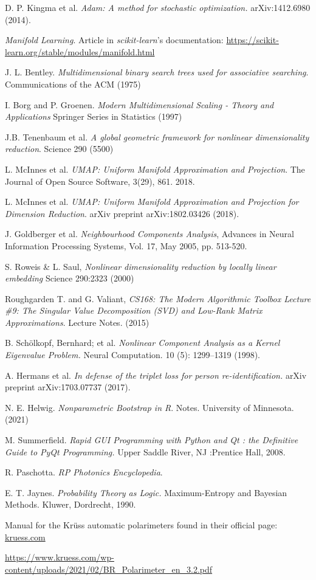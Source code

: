 \documentclass[11pt, a4paper, twoside]{article} %
\begin{document}
\begin{thebibliography}{1}
{
D. P. Kingma et al. {\em Adam: A method for stochastic optimization.} arXiv:1412.6980 (2014).

{\em Manifold Learning}. Article in {\em scikit-learn}'s documentation: \href{https://scikit-learn.org/stable/modules/manifold.html}{https://scikit-learn.org/stable/modules/manifold.html}

J. L. Bentley. {\em Multidimensional binary search trees used for associative searching}. Communications of the ACM (1975)

I. Borg and P. Groenen. {\em Modern Multidimensional Scaling - Theory and Applications} Springer Series in Statistics (1997)

J.B. Tenenbaum et al. {\em A global geometric framework for nonlinear dimensionality reduction}.  Science 290 (5500)


L. McInnes et al. {\em UMAP: Uniform Manifold Approximation and Projection}. The Journal of Open Source Software, 3(29), 861. 2018.

L. McInnes et al. {\em UMAP: Uniform Manifold Approximation and Projection for Dimension Reduction}. arXiv preprint arXiv:1802.03426 (2018).

J. Goldberger et al. {\em Neighbourhood Components Analysis}, Advances in Neural Information Processing Systems, Vol. 17, May 2005, pp. 513-520.

S. Roweis \& L. Saul, {\em Nonlinear dimensionality reduction by locally linear embedding} Science 290:2323 (2000)

Roughgarden T. and G. Valiant, {\em CS168: The Modern Algorithmic Toolbox Lecture \#9: The Singular Value Decomposition (SVD) and Low-Rank Matrix Approximations}. Lecture Notes. (2015)

B. Schölkopf, Bernhard; et al. {\em Nonlinear Component Analysis as a Kernel Eigenvalue Problem.} Neural Computation. 10 (5): 1299–1319 (1998).

A. Hermans et al. {\em In defense of the triplet loss for person re-identification.} arXiv preprint arXiv:1703.07737 (2017).

N. E. Helwig. {\em Nonparametric Bootstrap in R}. Notes. University of Minnesota. (2021)

M. Summerfield. {\em Rapid GUI Programming with Python and Qt : the Definitive Guide to PyQt Programming.} Upper Saddle River, NJ :Prentice Hall, 2008.

R. Paschotta. {\em RP Photonics Encyclopedia}.

E. T. Jaynes. {\em Probability Theory as Logic.} Maximum-Entropy and Bayesian Methods. Kluwer, Dordrecht, 1990.


Manual for the Krüss automatic polarimeters found in their official page:  \href{kruess.com}{kruess.com}

\href{https://www.kruess.com/wp-content/uploads/2021/02/BR_Polarimeter_en_3.2.pdf}{https://www.kruess.com/wp-content/uploads/2021/02/BR\_Polarimeter\_en\_3.2.pdf}
}
\end{thebibliography}
\end{document}
